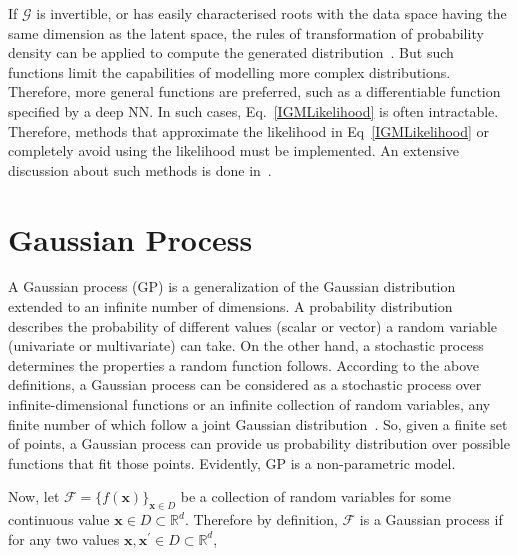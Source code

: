 If $\mathcal{G}$ is invertible, or has easily characterised roots with the data space having the same dimension as the latent space, the rules of transformation of probability density can be applied to compute the generated distribution~\cite{LearnIGM}. But such functions limit the capabilities of modelling more complex distributions. Therefore, more general functions are preferred, such as a differentiable function specified by a deep NN. In such cases, Eq.~\ref{IGMLikelihood} is often intractable. Therefore, methods that approximate the likelihood in Eq~\ref{IGMLikelihood} or completely avoid using the likelihood must be implemented. An extensive discussion about such methods is done in~\cite{LearnIGM}.


    

\section{Gaussian Process}\label{GP}
A Gaussian process (GP) is a generalization of the Gaussian distribution extended to an infinite number of dimensions. A probability distribution describes the probability of different values (scalar or vector) a random variable (univariate or multivariate) can take. On the other hand, a stochastic process determines the properties a random function follows. According to the above definitions, a Gaussian process can be considered as a stochastic process over infinite-dimensional functions or an infinite collection of random variables, any finite number of which follow a joint Gaussian distribution~\cite{GPML}. So, given a finite set of points, a Gaussian process can provide us probability distribution over possible functions that fit those points. Evidently, GP is a non-parametric model. 
\newline

Now, let $\mathcal{F}=\{f(\mathbf{x})\}_{\mathbf{x} \in D}$ be a collection of random variables for some continuous value $\mathbf{x} \in D \subset \mathbb{R}^d$. Therefore by definition, $\mathcal{F}$ is a Gaussian process if for any two values $\mathbf{x}, \mathbf{x}^{\prime} \in D \subset \mathbb{R}^d$,

